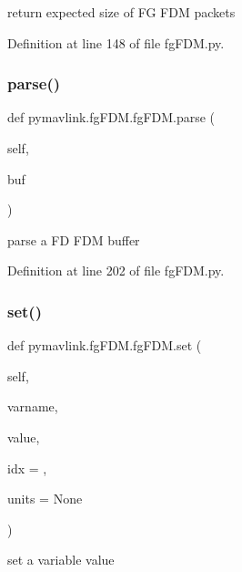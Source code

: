 \begin{DoxyVerb}return expected size of FG FDM packets\end{DoxyVerb}
 

Definition at line 148 of file fg\+F\+D\+M.\+py.

\mbox{\label{classpymavlink_1_1fgFDM_1_1fgFDM_a706a022185739c6b22a0e5ccdaedf886}} 
\subsubsection{\texorpdfstring{parse()}{parse()}}
{\footnotesize\ttfamily def pymavlink.\+fg\+F\+D\+M.\+fg\+F\+D\+M.\+parse (\begin{DoxyParamCaption}\item[{}]{self,  }\item[{}]{buf }\end{DoxyParamCaption})}

\begin{DoxyVerb}parse a FD FDM buffer\end{DoxyVerb}
 

Definition at line 202 of file fg\+F\+D\+M.\+py.

\mbox{\label{classpymavlink_1_1fgFDM_1_1fgFDM_a850f093cb48104e97a5176e79390ac85}} 
\subsubsection{\texorpdfstring{set()}{set()}}
{\footnotesize\ttfamily def pymavlink.\+fg\+F\+D\+M.\+fg\+F\+D\+M.\+set (\begin{DoxyParamCaption}\item[{}]{self,  }\item[{}]{varname,  }\item[{}]{value,  }\item[{}]{idx = {},  }\item[{}]{units = {\ttfamily None} }\end{DoxyParamCaption})}

\begin{DoxyVerb}set a variable value\end{DoxyVerb}
 

